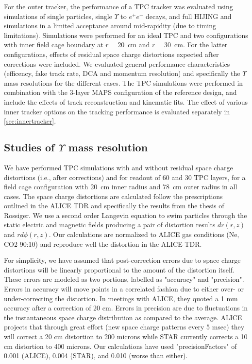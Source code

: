 For the outer tracker, the performance of a TPC tracker was evaluated using \geant simulations of single particles, single $\Upsilon$ to $e^+ e^-$
decays, and full HIJING and \geant simulations in a limited acceptance around mid-rapidity (due to timing limitations). Simulations were performed
for an ideal TPC and two configurations with inner field cage boundary at $r=20$~cm and $r=30$~cm. For the latter configurations, effects of 
residual space charge distortions expected after corrections were included. We evaluated general performance characteristics (efficency, fake track
rate, DCA and momentum resolution) and specifically the $\Upsilon$ mass resolutions for the different cases. The TPC simulations were performed
in combination with the 3-layer MAPS configuration of the reference design, and include the effects of track reconstruction and kinematic fits. 
The effect of various inner tracker options on the tracking performance is evaluated separately in \ref{sec:innertracker}.

\subsection{Studies of $\Upsilon$ mass resolution}

We have performed TPC simulations with and without residual space charge distortions
(i.e., after corrections)  and for readout of 60 and 30 TPC layers, for a field cage configuration with 20~cm inner radius and 78~cm outer radius 
in all cases. The space charge distortions are calculated follow the prescriptions outlined in the ALICE TDR and 
specifically the results from the thesis of Rossiger.  We use a second order Langevin equation to 
swim particles through the static electric and magnetic fields producing a pair of distortion results $dr(r,z)$ and $rd{\phi}(r,z)$.  
Our calculations are normalized to ALICE gas conditions (Ne, CO2 90:10) and reproduce well the distortion in the ALICE TDR.  

For simplicity, we have assumed that post-correction errors due to space charge distortions will be linearly proportional to the amount of the 
distortion itself.  These errors are modeled as two portions, labelled as "accuracy" and "precision".  Errors in accuracy will move points 
in a correlated fashion due to either over- or under-correcting the distortion.  In meetings with ALICE, they quoted a 1 mm accuracy 
after a correction of 20 cm.  Errors in precision are due to fluctuations in the instantaneous space charge distribution as compared to the average.  
ALICE projects that through great effort (new space charge patterns every 5 msec) they will correct a 20 cm distortion to 200 microns while STAR currently corrects a 10 cm distortion to 400 microns.  Our calculations have used "precisionFactors" of 0.001 (ALICE), 0.004 (STAR), and 0.010 (worse than either).

